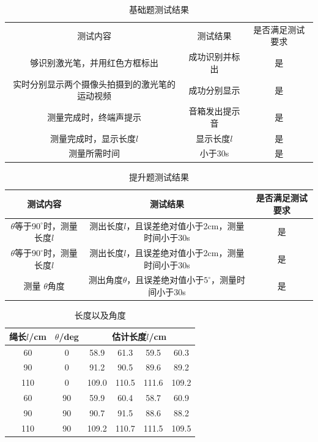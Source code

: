 \documentclass[scheme=chinese,a4paper]{article}
\begin{document}
\begin{appendices}

\begin{table}[H]
  \centering
  \caption{基础题测试结果}
    \begin{tabular}{ccc}
    \toprule
    \multirow{1}[2]{*}{测试内容} & \multirow{1}[2]{*}{测试结果} & \multirow{1}[2]{*}{是否满足测试要求}\\
    
    够识别激光笔，并用红色方框标出   &   成功识别并标出    & 是\\
    \midrule
    实时分别显示两个摄像头拍摄到的激光笔的运动视频    &  成功分别显示  & 是  \\
    \midrule
    测量完成时，终端声提示    &  音箱发出提示音  & 是   \\
    \midrule
    测量完成时，显示长度$l$    &  显示长度$l$  & 是   \\
    \midrule
    测量所需时间    &  小于30s  & 是   \\
    \bottomrule
    \end{tabular}%
\end{table}%
\begin{table}[H]
  \centering
  \caption{提升题测试结果}
    \begin{tabular}{ccc}
    \toprule
    \multirow{1}[2]{*}{测试内容} & \multirow{1}[2]{*}{测试结果} & \multirow{1}[2]{*}{是否满足测试要求}\\
    \midrule
    $\theta$等于$90^\circ$时，测量长度$l$    &  测出长度$l$，且误差绝对值小于2cm，测量时间小于30s  & 是\\
    \midrule
    $\theta$等于$90^\circ$时，测量长度$l$    &  测出长度$l$，且误差绝对值小于2cm，测量时间小于30s  & 是\\
    \midrule
    测量 $\theta$角度   &  测出角度$\theta$，且误差绝对值小于$5^\circ$，测量时间小于30s  & 是  \\
    \bottomrule
    \end{tabular}%
\end{table}%


\begin{table}[htbp]
  \centering
  \caption{长度以及角度}
  \begin{tabular}{cccccc}
  \hline
    绳长$l$/cm & $\theta$/deg & \multicolumn{4}{c}{估计长度$\hat{l}$/cm}  \\ 
    \hline
    60 & 0 & 58.9 & 61.3       & 59.5 & 60.3 \\
    90 & 0 & 91.2 &  90.5       & 89.6        & 89.2   \\
    110 & 0 & 109.0 &  110.5       & 111.6        & 109.2   \\
    60 & 90 & 59.9 & 60.4        & 58.7 & 60.9 \\
    90 & 90 & 90.7 &  91.5       & 88.6        & 88.2   \\
    110 & 90 & 109.2 &  110.7       & 111.5        & 109.5   \\
    \hline
  \end{tabular}
\end{table}


\end{appendices}
\end{document}
